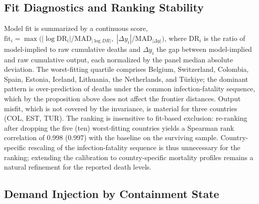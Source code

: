 \documentclass[12pt, a4paper]{article}
\begin{document}
\subsection{Fit Diagnostics and Ranking Stability}
\label{app:country_fit}

Model fit is summarized by a continuous score,
\(\text{fit}_i = \max\!\big(|\log \text{DR}_i|/\text{MAD}_{|\log DR|},\;
|\Delta y_i|/\text{MAD}_{|\Delta y|}\big)\), where \(\text{DR}_i\) is the
ratio of model-implied to raw cumulative deaths and \(\Delta y_i\) the gap
between model-implied and raw cumulative output, each normalized by the
panel median absolute deviation. The worst-fitting quartile comprises
Belgium, Switzerland, Colombia, Spain, Estonia, Iceland, Lithuania, the
Netherlands, and T\"urkiye; the dominant pattern
is over-prediction of deaths under the common infection-fatality sequence,
which by the proposition above does not affect the frontier distances.
Output misfit, which is not covered by the invariance, is material for three
countries (COL, EST, TUR). The ranking is insensitive to fit-based
exclusion: re-ranking after dropping the five (ten) worst-fitting countries
yields a Spearman rank correlation of 0.998 (0.997) with the baseline on the
surviving sample. Country-specific rescaling of the infection-fatality
sequence is thus unnecessary for the ranking; extending the calibration to
country-specific mortality profiles remains a natural refinement for the
reported death levels.

\subsection{Demand Injection by Containment State}
\label{app:di_decomposition}
\end{document}
